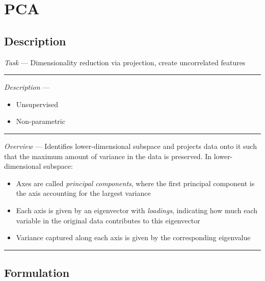 \section{PCA}
\subsection*{Description}
\emph{Task} --- Dimensionality reduction via projection, create uncorrelated features

{\color{lightgray}\hrule height 0.001mm}

\emph{Description} --- 
\begin{itemize}
    \item Unsupervised
    \item Non-parametric
\end{itemize}

{\color{lightgray}\hrule height 0.001mm}

\emph{Overview} --- 
Identifies lower-dimensional subspace and projects data onto it such that the maximum amount of variance in the data is preserved. In lower-dimensional subspace:
\begin{itemize}
    \item Axes are called \emph{principal components}, where the first principal component is the axis accounting for the largest variance
    \item Each axis is given by an eigenvector with \emph{loadings}, indicating how much each variable in the original data contributes to this eigenvector
    \item Variance captured along each axis is given by the corresponding eigenvalue
\end{itemize}

{\color{black}\hrule height 0.001mm}

\subsection*{Formulation}

